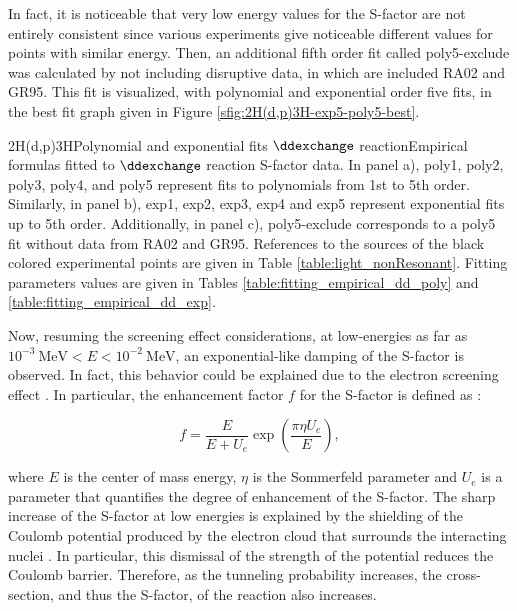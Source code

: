 \documentclass[openany]{book}
\begin{document}
 In fact, it is noticeable that very low energy values for the S-factor are not entirely consistent since various experiments give noticeable different values for points with similar energy. Then, an additional fifth order fit called poly5-exclude was calculated by not including disruptive data, in which are included RA02 and GR95. This fit is visualized, with polynomial and exponential order five fits, in the best fit graph given in Figure \ref{sfig:2H(d,p)3H-exp5-poly5-best}.

{2H(d,p)3H}{Polynomial and exponential fits $\ddexchange$ reaction}{Empirical formulas fitted to $\ddexchange$ reaction S-factor data. In panel a), poly1, poly2, poly3, poly4, and poly5 represent fits to polynomials from 1st to 5th order.  Similarly, in panel b), exp1, exp2, exp3, exp4 and exp5 represent exponential fits up to 5th order. Additionally, in panel c), poly5-exclude corresponds to a poly5 fit without data from RA02 and GR95. References to the sources of the black colored experimental points are given in Table \ref{table:light_nonResonant}. Fitting parameters values are given in Tables \ref{table:fitting_empirical_dd_poly} and \ref{table:fitting_empirical_dd_exp}.}


Now, resuming the screening effect considerations, at low-energies as far as $ \mathrm{10^{-3} \ MeV}  <  E<\mathrm{10^{-2} \ MeV}$, an exponential-like damping of the S-factor is observed. In fact, this behavior could be explained due to the electron screening effect \cite{raiola_migliardi_gyurky_aliotta_formicola_bonetti_broggini_campajola_corvisiero_costantini_et_2002}. In particular, the enhancement factor $f$ for the S-factor is defined as \cite{assenbaum_langanke_rolfs_1987}: 

\begin{equation}\label{eq:screening_factor}
	f = \frac{E}{E + U_e}\exp{\left(\frac{\pi \eta U_e}{E}\right)},
\end{equation}

where $E$ is the center of mass energy, $\eta$ is the Sommerfeld parameter and $U_e$ is a parameter that quantifies the degree of enhancement of the S-factor. The sharp increase of the S-factor at low energies is explained by the shielding of the Coulomb potential produced by the electron cloud that surrounds the interacting nuclei \cite{assenbaum_langanke_rolfs_1987}. In particular, this dismissal of the strength of the potential reduces the Coulomb barrier. Therefore, as the tunneling probability increases, the cross-section, and thus the S-factor, of the reaction also increases. \\
\end{document}
